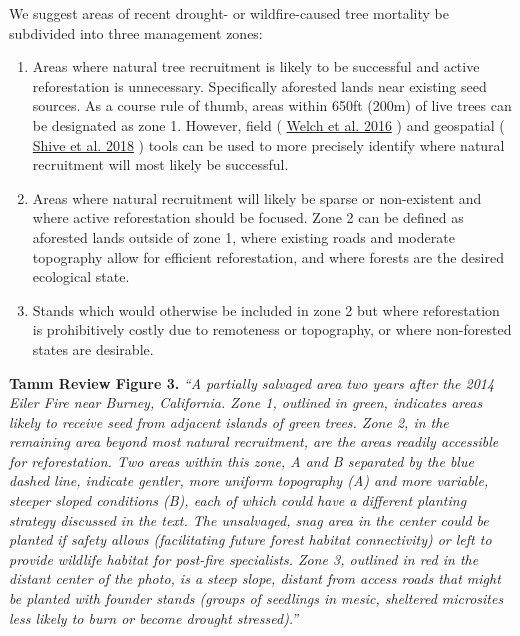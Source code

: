 \documentclass[]{article}
\begin{document}
We suggest areas of recent drought- or wildfire-caused tree mortality be
subdivided into three management zones:

\begin{enumerate}
\def\labelenumi{\arabic{enumi})}
\item
  Areas where natural tree recruitment is likely to be successful and
  active reforestation is unnecessary. Specifically aforested lands near
  existing seed sources. As a course rule of thumb, areas within 650ft
  (200m) of live trees can be designated as zone 1. However, field (
  \href{https://esajournals.onlinelibrary.wiley.com/doi/full/10.1002/ecs2.1609}{Welch
  et al. 2016} ) and geospatial (
  \href{https://esajournals.onlinelibrary.wiley.com/doi/10.1002/eap.1756}{Shive
  et al. 2018} ) tools can be used to more precisely identify where
  natural recruitment will most likely be successful.
\item
  Areas where natural recruitment will likely be sparse or non-existent
  and where active reforestation should be focused. Zone 2 can be
  defined as aforested lands outside of zone 1, where existing roads and
  moderate topography allow for efficient reforestation, and where
  forests are the desired ecological state.
\item
  Stands which would otherwise be included in zone 2 but where
  reforestation is prohibitively costly due to remoteness or topography,
  or where non-forested states are desirable.
\end{enumerate}

 \textbf{Tamm Review Figure 3.} \emph{``A partially salvaged area two
years after the 2014 Eiler Fire near Burney, California. Zone 1,
outlined in green, indicates areas likely to receive seed from adjacent
islands of green trees. Zone 2, in the remaining area beyond most
natural recruitment, are the areas readily accessible for reforestation.
Two areas within this zone, A and B separated by the blue dashed line,
indicate gentler, more uniform topography (A) and more variable, steeper
sloped conditions (B), each of which could have a different planting
strategy discussed in the text. The unsalvaged, snag area in the center
could be planted if safety allows (facilitating future forest habitat
connectivity) or left to provide wildlife habitat for post-fire
specialists. Zone 3, outlined in red in the distant center of the photo,
is a steep slope, distant from access roads that might be planted with
founder stands (groups of seedlings in mesic, sheltered microsites less
likely to burn or become drought stressed).''}\\
\end{document}
